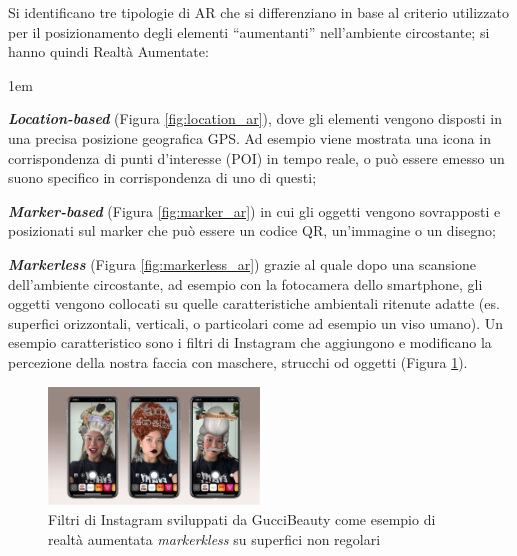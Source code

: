 Si identificano tre tipologie di AR che si differenziano in base al criterio utilizzato per il posizionamento degli elementi \enquote{aumentanti} nell'ambiente circostante; si hanno quindi Realtà Aumentate:

\begin{description}
    \itemsep1em
    \item \textbf{\textit{Location-based}} (Figura \ref{fig:location_ar}), dove gli elementi vengono disposti in una precisa posizione geografica GPS. Ad esempio viene mostrata una icona in corrispondenza di punti d'interesse (POI) in tempo reale, o può essere emesso un suono specifico in corrispondenza di uno di questi;
    \item \textbf{\textit{Marker-based}} (Figura \ref{fig:marker_ar}) in cui gli oggetti vengono sovrapposti e posizionati sul marker che può essere un codice QR, un'immagine o un disegno;
    \item \textbf{\textit{Markerless}} (Figura \ref{fig:markerless_ar}) grazie al quale dopo una scansione dell'ambiente circostante, ad esempio con la fotocamera dello smartphone, gli oggetti vengono collocati su quelle caratteristiche ambientali ritenute adatte (es. superfici orizzontali, verticali, o particolari come ad esempio un viso umano). Un esempio caratteristico sono i filtri di Instagram che aggiungono e modificano la percezione della nostra faccia con maschere, strucchi od oggetti (Figura \ref{fig:instaFilter}).
    \begin{figure} 
        \centering
        \includegraphics[width=0.5\textwidth]{img/instaFilter.jpeg}
        \caption{Filtri di Instagram sviluppati da GucciBeauty come esempio di realtà aumentata \textit{markerkless} su superfici non regolari \cite{gucciInstaAR}}
        \label{fig:instaFilter}
    \end{figure}
\end{description}

